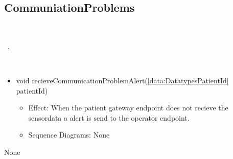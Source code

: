   \subsection{CommuniationProblems}\label{int:InterfacesCommuniationProblems}
    \begin{description}
      \item[Provided by:] \iconcomponent{}~
      \item[Required by:] \iconcomponent{}~, \iconcomponent{}~ 
      \item[Operations:] ~
    \begin{itemize}[noitemsep,nolistsep,leftmargin=-.25cm]
      \item \textsf{void recieveCommunicationProblemAlert(\ref{data:DatatypesPatientId} patientId)}
        \begin{itemize}[noitemsep,nolistsep]
           \item Effect: When the patient gateway endpoint does not recieve the sensordata a alert is send to the operator endpoint. 
           \item Sequence Diagrams: None
        \end{itemize}
    \end{itemize}
      \item[Diagrams:] None
    \end{description}

